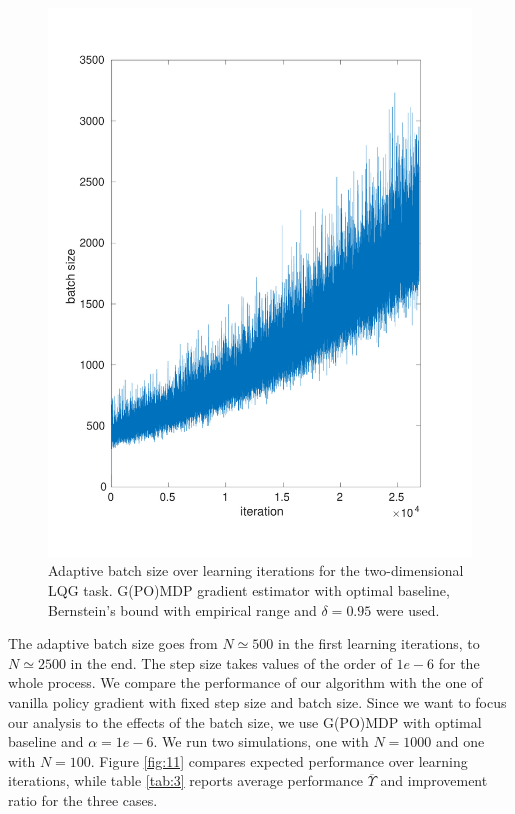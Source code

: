 \begin{figure}[h!]
\includegraphics[width = \textwidth,left]{Images/lqg2d_batchsize.pdf}
\caption[Adaptive batch size over learning iterations in the two-dimensional LQG task.]{Adaptive batch size over learning iterations for the two-dimensional \ac{LQG} task. G(PO)MDP gradient estimator with optimal baseline, Bernstein's bound with empirical range and $\delta=0.95$ were used.}
\label{fig:10}
\end{figure}

The adaptive batch size goes from $N \simeq 500$ in the first learning iterations, to $N\simeq2500$ in the end. The step size takes values of the order of $1e-6$ for the whole process.
We compare the performance of our algorithm with the one of vanilla policy gradient with fixed step size and batch size. Since we want to focus our analysis to the effects of the batch size, we use G(PO)MDP with optimal baseline and $\alpha=1e-6$. We run two simulations, one with $N=1000$ and one with $N=100$. Figure \ref{fig:11} compares expected performance over learning iterations, while table \ref{tab:3} reports average performance $\overline{\Upsilon}$ and improvement ratio for the three cases.

